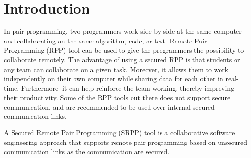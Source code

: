 \section{Introduction}

In pair programming, two programmers  work side by side at the same computer and collaborating on the same algorithm, code, or test. Remote Pair Programming (RPP) tool can be used to give the programmers the possibility to collaborate remotely. The advantage of using a secured RPP is that students or any team can collaborate on a given  task. Moreover,  it allows them to work independently on their own computer while sharing data for each other in real-time. Furthermore, it can help reinforce the team working, thereby improving their productivity. Some of the RPP tools out there does not support secure communication, and are recommended to be used over internal secured communication links. 

A Secured Remote Pair Programming (SRPP) tool is a collaborative software engineering approach that supports remote pair programming based on unsecured communication links as the communication are secured. 

